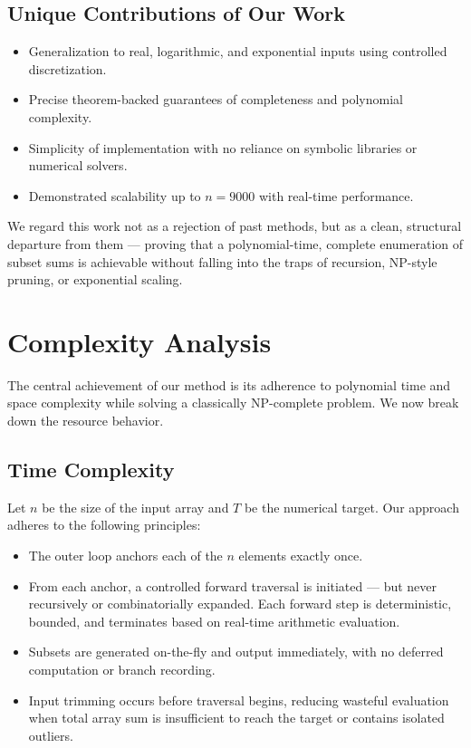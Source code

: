 \documentclass[11pt]{article}
\begin{document}
\vspace{1em}





\subsection{Unique Contributions of Our Work}

\begin{itemize}
  \item Generalization to real, logarithmic, and exponential inputs using controlled discretization.
  \item Precise theorem-backed guarantees of completeness and polynomial complexity.
  \item Simplicity of implementation with no reliance on symbolic libraries or numerical solvers.
  \item Demonstrated scalability up to $n = 9000$ with real-time performance.
\end{itemize}

We regard this work not as a rejection of past methods, but as a clean, structural departure from them — proving that a polynomial-time, complete enumeration of subset sums is achievable without falling into the traps of recursion, NP-style pruning, or exponential scaling.

\vspace{1em}





\section{Complexity Analysis} \label{sec:complexity}

The central achievement of our method is its adherence to polynomial time and space complexity while solving a classically NP-complete problem. We now break down the resource behavior.

\subsection{Time Complexity}

Let $n$ be the size of the input array and $T$ be the numerical target. Our approach adheres to the following principles:

\begin{itemize}
    \item The outer loop anchors each of the $n$ elements exactly once.
    \item From each anchor, a controlled forward traversal is initiated — but never recursively or combinatorially expanded. Each forward step is deterministic, bounded, and terminates based on real-time arithmetic evaluation.
    \item Subsets are generated on-the-fly and output immediately, with no deferred computation or branch recording.
    \item Input trimming occurs before traversal begins, reducing wasteful evaluation when total array sum is insufficient to reach the target or contains isolated outliers.
\end{itemize}
\end{document}
